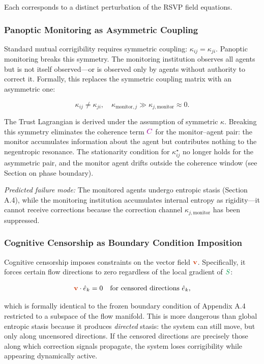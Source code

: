 \documentclass[11pt,a4paper]{article}
\newcommand{\vect}[1]{\textcolor{vectorcolor}{\ensuremath{\mathbf{#1}}}}
\newcommand{\entropy}[1]{\textcolor{entropycolor}{\ensuremath{#1}}}
\newcommand{\coherence}[1]{\textcolor{coherencecolor}{\ensuremath{#1}}}
\theoremstyle{definition}
\theoremstyle{plain}
\begin{document}
Each corresponds to a distinct perturbation of the RSVP field equations.

\subsubsection{Panoptic Monitoring as Asymmetric Coupling}

Standard mutual corrigibility requires symmetric coupling: $\kappa_{ij} = \kappa_{ji}$. Panoptic monitoring breaks this symmetry. The monitoring institution observes all agents but is not itself observed---or is observed only by agents without authority to correct it. Formally, this replaces the symmetric coupling matrix with an asymmetric one:

\begin{equation}
\kappa_{ij} \neq \kappa_{ji}, \quad \kappa_{\text{monitor}, j} \gg \kappa_{j, \text{monitor}} \approx 0.
\end{equation}

The Trust Lagrangian is derived under the assumption of symmetric $\kappa$. Breaking this symmetry eliminates the coherence term $\coherence{C}$ for the monitor--agent pair: the monitor accumulates information about the agent but contributes nothing to the negentropic resonance. The stationarity condition for $\kappa_{ij}^{\star}$ no longer holds for the asymmetric pair, and the monitor agent drifts outside the coherence window (see Section on phase boundary).

\textit{Predicted failure mode:} The monitored agents undergo entropic stasis (Section A.4), while the monitoring institution accumulates internal entropy as rigidity---it cannot receive corrections because the correction channel $\kappa_{j, \text{monitor}}$ has been suppressed.

\subsubsection{Cognitive Censorship as Boundary Condition Imposition}

Cognitive censorship imposes constraints on the vector field $\vect{v}$. Specifically, it forces certain flow directions to zero regardless of the local gradient of $\entropy{S}$:

\begin{equation}
\vect{v} \cdot \hat{e}_k = 0 \quad \text{for censored directions } \hat{e}_k,
\end{equation}

which is formally identical to the frozen boundary condition of Appendix A.4 restricted to a subspace of the flow manifold. This is more dangerous than global entropic stasis because it produces \emph{directed} stasis: the system can still move, but only along uncensored directions. If the censored directions are precisely those along which correction signals propagate, the system loses corrigibility while appearing dynamically active.
\end{document}
